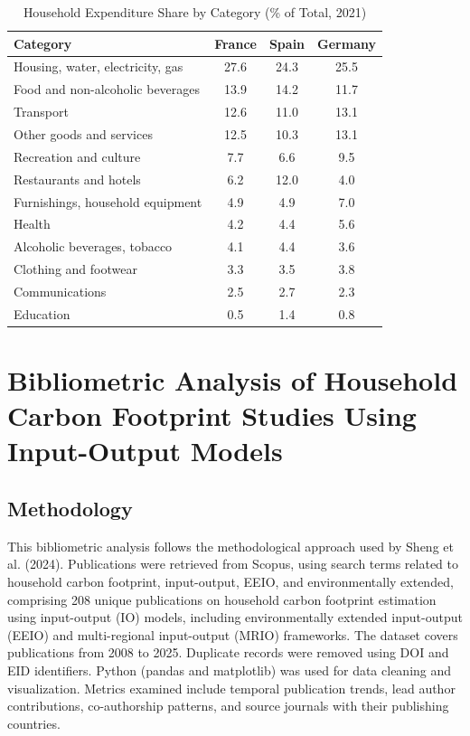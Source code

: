 \documentclass[12pt,a4paper]{article}%
\begin{document}
\begin{table}[h]
\centering
\caption{Household Expenditure Share by Category (\% of Total, 2021)}
\label{tab:appendix_expenditure}
\begin{tabular}{lccc}
\hline
\textbf{Category} & \textbf{France} & \textbf{Spain} & \textbf{Germany}\\
\hline
Housing, water, electricity, gas & 27.6 & 24.3 & 25.5\\
Food and non-alcoholic beverages & 13.9 & 14.2 & 11.7\\
Transport & 12.6 & 11.0 & 13.1\\
Other goods and services & 12.5 & 10.3 & 13.1\\
Recreation and culture & 7.7 & 6.6 & 9.5\\
Restaurants and hotels & 6.2 & 12.0 & 4.0\\
Furnishings, household equipment & 4.9 & 4.9 & 7.0\\
Health & 4.2 & 4.4 & 5.6\\
Alcoholic beverages, tobacco & 4.1 & 4.4 & 3.6\\
Clothing and footwear & 3.3 & 3.5 & 3.8\\
Communications & 2.5 & 2.7 & 2.3\\
Education & 0.5 & 1.4 & 0.8\\
\hline
\end{tabular}
\end{table}

\section{Bibliometric Analysis of Household Carbon Footprint Studies Using Input-Output Models}

\subsection{Methodology}

This bibliometric analysis follows the methodological approach used by Sheng et al. (2024). Publications were retrieved from Scopus, using search terms related to household carbon footprint, input-output, EEIO, and environmentally extended, comprising 208 unique publications on household carbon footprint estimation using input-output (IO) models, including environmentally extended input-output (EEIO) and multi-regional input-output (MRIO) frameworks. The dataset covers publications from 2008 to 2025. Duplicate records were removed using DOI and EID identifiers. Python (pandas and matplotlib) was used for data cleaning and visualization. Metrics examined include temporal publication trends, lead author contributions, co-authorship patterns, and source journals with their publishing countries.
\end{document}
